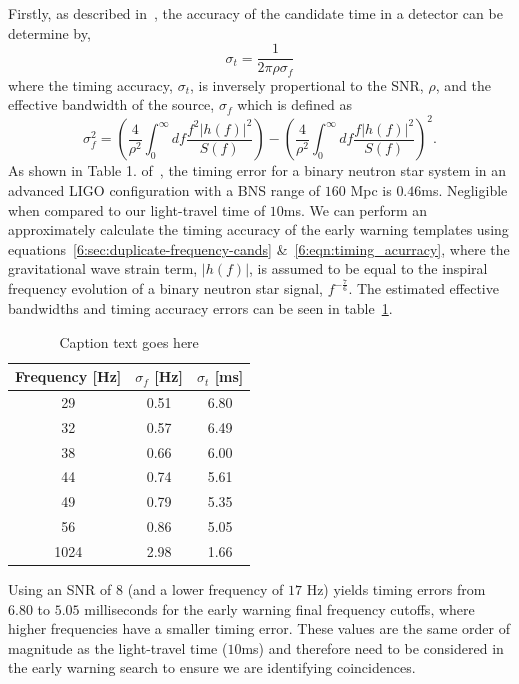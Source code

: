 Firstly, as described in~\cite{Fairhurst:2010}, the accuracy of the candidate time in a detector can be determine by,
%
\begin{equation}
    \sigma_{t} = \frac{1}{2\pi\rho\sigma_{f}}
    \label{6:eqn:timing_acurracy}
\end{equation}
%
where the timing accuracy, $\sigma_{t}$, is inversely propertional to the SNR, $\rho$, and the effective bandwidth of the source, $\sigma_{f}$ which is defined as
%
\begin{equation}
    \sigma_{f}^2 = \left(\frac{4}{\rho^{2}} \int^{\infty}_{0} df \frac{f^{2}|h(f)|^{2}}{S(f)}\right) - \left(\frac{4}{\rho^{2}} \int^{\infty}_{0} df \frac{f|h(f)|^{2}}{S(f)}\right)^{2} .
    \label{6:eqn:eff_bandiwdth}
\end{equation}
%
As shown in Table 1. of~\cite{Fairhurst:2010}, the timing error for a binary neutron star system in an advanced LIGO configuration with a BNS range of $160$ Mpc is $0.46$ms. Negligible when compared to our light-travel time of $10$ms. We can perform an approximately calculate the timing accuracy of the early warning templates using equations~\ref{6:sec:duplicate-frequency-cands} \&~\ref{6:eqn:timing_acurracy}, where the gravitational wave strain term, $|h(f)|$, is assumed to be equal to the inspiral frequency evolution of a binary neutron star signal, $f^{-\frac{7}{6}}$. The estimated effective bandwidths and timing accuracy errors can be seen in table~\ref{6:tab:timing_errors}.
%
\begin{table}[ht]
    \centering
    \setlength{\tabcolsep}{4pt}
    \begin{tabular}{ccc}
        \toprule
        \textbf{Frequency [Hz]} & $\sigma_{f}$ [Hz] & $\sigma_{t}$ [ms] \\
        \midrule
        29 & 0.51 & 6.80 \\
        32 & 0.57 & 6.49 \\
        38 & 0.66 & 6.00 \\
        44 & 0.74 & 5.61 \\
        49 & 0.79 & 5.35 \\
        56 & 0.86 & 5.05 \\
        1024 & 2.98 & 1.66 \\
        \bottomrule
    \end{tabular}
    \caption{Caption text goes here}
    \label{6:tab:timing_errors}
\end{table}
%
Using an SNR of $8$ (and a lower frequency of $17$ Hz) yields timing errors from $6.80$ to $5.05$ milliseconds for the early warning final frequency cutoffs, where higher frequencies have a smaller timing error. These values are the same order of magnitude as the light-travel time ($10$ms) and therefore need to be considered in the early warning search to ensure we are identifying coincidences.

